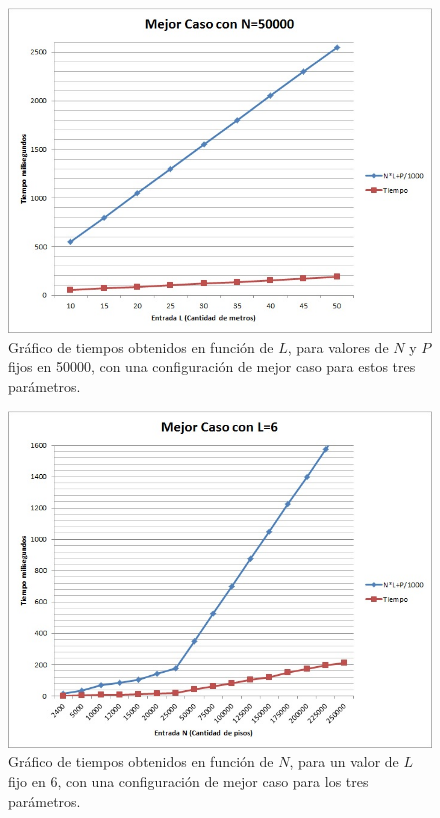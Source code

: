 \begin{figure}[H]
\centering
\includegraphics[scale=0.6]{../MejorCasoEj2Nfijo.jpg}
\caption{Gráfico de tiempos obtenidos en función de $L$, para valores de $ N $ y $ P $ fijos en 50000, con una configuración de mejor caso para estos tres parámetros.}
\label{mejorCasoNfijo}
\end{figure}

\begin{figure}[H]
\centering
\includegraphics[scale=0.6]{../MejorCasoEj2Lfijo.jpg}
\caption{Gráfico de tiempos obtenidos en función de $N$, para un valor de $ L $  fijo en 6, con una configuración de mejor caso para los tres parámetros.}
\label{mejorCasoLfijo}
\end{figure}

